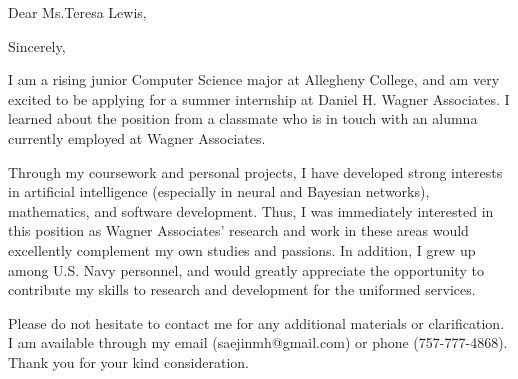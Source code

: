 \documentclass[11pt,a4paper,sans]{moderncv}        %
\begin{document}
\date{March 31, 2017}
\opening{Dear Ms.\hspace{0.62mm}Teresa Lewis,}
\closing{Sincerely,}
\makelettertitle

\justify
I am a rising junior Computer Science major at Allegheny College, and am very excited to be applying for a summer internship at Daniel H. Wagner Associates. I learned about the position from a classmate who is in touch with an alumna currently employed at Wagner Associates.

Through my coursework and personal projects, I have developed strong interests in artificial intelligence (especially in neural and Bayesian networks), mathematics, and software development. Thus, I was immediately interested in this position as Wagner Associates' research and work in these areas would excellently complement my own studies and passions. In addition, I grew up among U.S. Navy personnel, and would greatly appreciate the opportunity to contribute my skills to research and development for the uniformed services.

Please do not hesitate to contact me for any additional materials or clarification. I am available through my email (saejinmh@gmail.com) or phone (757-777-4868). Thank you for your kind consideration.
\newline\newline


\makeletterclosing
\end{document}
